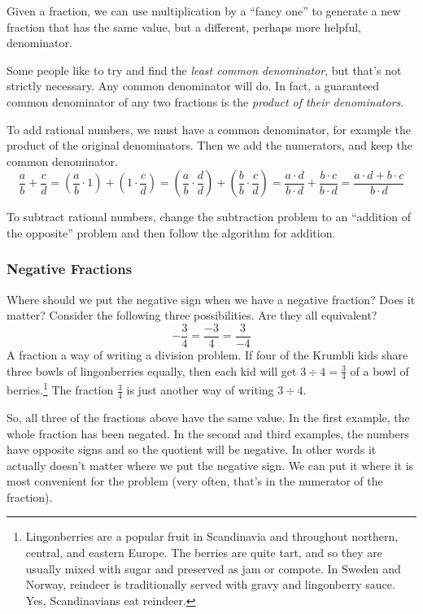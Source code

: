 Given a fraction, we can use multiplication by a ``fancy one'' to generate a new fraction that has the same value, but a different, perhaps more helpful, denominator.

Some people like to try and find the {\em least common denominator}, but that's not strictly necessary. Any common denominator will do. In fact, a guaranteed common denominator of any two fractions is the {\em product of their denominators}.

\begin{boxeddef}
To add rational numbers, we must have a common denominator, for example the product of the original denominators. Then we add the numerators, and keep the common denominator.
\[\frac{a}{b} + \frac{c}{d}
= \left( \frac{a}{b}\cdot 1 \right) + \left( 1\cdot\frac{c}{d} \right)
= \left( \frac{a}{b}\cdot\frac{d}{d} \right) + \left( \frac{b}{b}\cdot\frac{c}{d} \right)
= \frac{a\cdot d}{b\cdot d} + \frac{b\cdot c}{b\cdot d}
= \frac{a\cdot d + b\cdot c}{b\cdot d}\]

To subtract rational numbers, change the subtraction problem to an ``addition of the opposite'' problem and then follow the algorithm for addition.
\end{boxeddef}

\subsubsection*{Negative Fractions}

Where should we put the negative sign when we have a negative fraction? Does it matter? Consider the following three possibilities. Are they all equivalent? \[ -\frac{3}{4} = \frac{-3}{4} = \frac{3}{-4}\]
A fraction a way of writing a division problem. If four of the Krumbli kids share three bowls of lingonberries equally, then each kid will get $3\div4 = \frac{3}{4}$ of a bowl of berries.\footnote{Lingonberries are a popular fruit in Scandinavia and throughout northern, central, and eastern Europe. The berries are quite tart, and so they are usually mixed with sugar and preserved as jam or compote. In Sweden and Norway, reindeer is traditionally served with gravy and lingonberry sauce. Yes, Scandinavians eat reindeer.} The fraction $\frac{3}{4}$ is just another way of writing $3 \div 4$.

So, all three of the fractions above have the same value. In the first example, the whole fraction has been negated. In the second and third examples, the numbers have opposite signs and so the quotient will be negative. In other words it actually doesn't matter where we put the negative sign. We can put it where it is most convenient for the problem (very often, that's in the numerator of the fraction).

